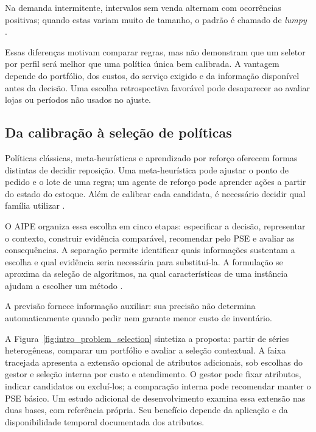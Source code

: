 Na demanda intermitente, intervalos sem venda alternam com ocorrências positivas; quando estas variam muito de tamanho, o padrão é chamado de \textit{lumpy} \citep{Croston1972ForecastingIntermittentDemand,Syntetos2005Categorization,Boylan2008Intermittent}.

Essas diferenças motivam comparar regras, mas não demonstram que um seletor por perfil será melhor que uma política única bem calibrada. A vantagem depende do portfólio, dos custos, do serviço exigido e da informação disponível antes da decisão. Uma escolha retrospectiva favorável pode desaparecer ao avaliar lojas ou períodos não usados no ajuste.

\subsection{Da calibração à seleção de políticas}

Políticas clássicas, meta-heurísticas e aprendizado por reforço oferecem formas distintas de decidir reposição. Uma meta-heurística pode ajustar o ponto de pedido e o lote de uma regra; um agente de reforço pode aprender ações a partir do estado do estoque. Além de calibrar cada candidata, é necessário decidir qual família utilizar \citep{Syntetos2009InventoryForecastingReview,Boute2022DRLInventoryRoadmap}.

O AIPE organiza essa escolha em cinco etapas: especificar a decisão, representar o contexto, construir evidência comparável, recomendar pelo PSE e avaliar as consequências. A separação permite identificar quais informações sustentam a escolha e qual evidência seria necessária para substituí-la. A formulação se aproxima da seleção de algoritmos, na qual características de uma instância ajudam a escolher um método \citep{Rice1976AlgorithmSelection,Kotthoff2014AlgorithmSelection}.

A previsão fornece informação auxiliar: sua precisão não determina automaticamente quando pedir nem garante menor custo de inventário.

A Figura~\ref{fig:intro_problem_selection} sintetiza a proposta: partir de séries heterogêneas, comparar um portfólio e avaliar a seleção contextual. A faixa tracejada apresenta a extensão opcional de atributos adicionais, sob escolhas do gestor e seleção interna por custo e atendimento. O gestor pode fixar atributos, indicar candidatos ou excluí-los; a comparação interna pode recomendar manter o PSE básico. Um estudo adicional de desenvolvimento examina essa extensão nas duas bases, com referência própria. Seu benefício depende da aplicação e da disponibilidade temporal documentada dos atributos.

